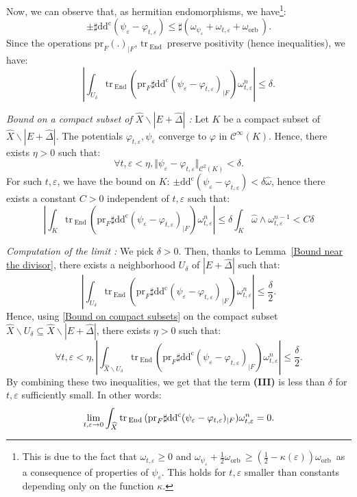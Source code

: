 \documentclass[12pt,a4paper]{amsart}
\newcommand{\orb}{\mathrm{orb}\,}
\newcommand{\End}{\mathrm{End}\,}
\newcommand{\ddc}{\mathrm{dd^c}}
\newcommand{\tr}{\mathrm{tr}\,}
\theoremstyle{plain}
\theoremstyle{definition}
\begin{document}
Now, we can observe that, as hermitian endomorphisms, we have\footnote{This is due to the fact that $\omega_{t, \varepsilon} \geq 0$ and $\omega_{\psi_\varepsilon} + \frac{1}{2} \omega_\orb \geq \left( \frac{1}{2} -\kappa(\varepsilon) \right) \omega_\orb$ as a consequence of properties of $\psi_\varepsilon$. This holds for $t, \varepsilon$ smaller than constants depending only on the function $\kappa$.}:
$$
\pm \sharp \ddc(\psi_\varepsilon - \varphi_{t, \varepsilon}) \leq \sharp \left( \omega_{\psi_\varepsilon} + \omega_{t, \varepsilon} + \omega_\orb \right).
$$
Since the operations $\mathrm{pr}_F (.)_{|F}$, $\tr_\End$ preserve positivity (hence inequalities), we have:
$$
\left| \int_{U_{\delta}} \tr_\End (\mathrm{pr}_F \sharp \ddc (\psi_\varepsilon - \varphi_{t,\varepsilon})_{|F}) \omega_{t, \varepsilon}^n \right| \leq \delta.
$$

\emph{Bound on a compact subset of $\widehat{X} \backslash |E + \widehat{\Delta}|$ :}
Let $K$ be a compact subset of $\widehat{X} \backslash |E + \widehat{\Delta}|$. The potentials $\varphi_{t, \varepsilon}, \psi_\varepsilon$ converge to $\varphi$ in $\mathcal{C}^\infty(K)$. Hence, there exists $\eta > 0$ such that: 
$$
\forall t, \varepsilon < \eta, \Vert \psi_\varepsilon - \varphi_{t, \varepsilon} \Vert_{\mathcal{C}^2(K)} < \delta.
$$
For such $t, \varepsilon$, we have the bound on $K$: $\pm \ddc \left( \psi_\varepsilon - \varphi_{t, \varepsilon} \right) < \delta \widehat{\omega}$, hence there exists a constant $C > 0$ independent of $t, \varepsilon$ such that:
\begin{equation}\label{Bound on compact subsets}
\left| \int_K \tr_\End (\mathrm{pr}_F \sharp \ddc (\psi_\varepsilon - \varphi_{t,\varepsilon})_{|F}) \omega_{t, \varepsilon}^n \right| \leq \delta \int_K \widehat{\omega} \wedge \omega_{t, \varepsilon}^{n-1} < C \delta
\end{equation}

\emph{Computation of the limit :} We pick $\delta > 0$. Then, thanks to Lemma~\ref{Bound near the divisor}, there exists a neighborhood $U_\delta$ of $|E + \widehat{\Delta}|$ such that:
$$
\left| \int_{U_{\delta}} \tr_\End (\mathrm{pr}_F \sharp \ddc (\psi_\varepsilon - \varphi_{t,\varepsilon})_{|F}) \omega_{t, \varepsilon}^n \right| \leq \frac{\delta}{2}.
$$
Hence, using \eqref{Bound on compact subsets} on the compact subset $\widehat{X} \backslash U_\delta \subseteq \widehat{X} \backslash |E + \widehat{\Delta}|$, there exists $\eta > 0$ such that:
$$
\forall t, \varepsilon < \eta, \left| \int_{\widehat{X} \backslash U_{\delta}} \tr_\End (\mathrm{pr}_F \sharp \ddc (\psi_\varepsilon - \varphi_{t,\varepsilon})_{|F}) \omega_{t, \varepsilon}^n \right| \leq \frac{\delta}{2}.
$$
By combining these two inequalities, we get that the term \textbf{(III)} is less than $\delta$ for $t, \varepsilon$ sufficiently small. In other words:
$$
\lim_{t, \varepsilon \to 0} \int_{\widehat{X}} \tr_\End (\mathrm{pr}_F \sharp \ddc (\psi_\varepsilon - \varphi_{t,\varepsilon})_{|F}) \omega_{t, \varepsilon}^n = 0.\\
$$
\end{document}
